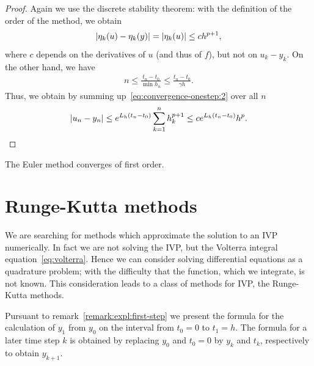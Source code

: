 \begin{proof}
  Again we use the discrete stability theorem: with the definition of
  the order of the method, we obtain
  \begin{gather}
    \label{eq:convergence-onestep:2}
    \lvert\eta_k(u)-\eta_k(y)\rvert = \lvert\eta_k(u)\rvert \le c h^{p+1},
  \end{gather}
  where $c$ depends on the derivatives of $u$ (and thus of $f$), but
  not on $u_k-y_k$. On the other hand, we have
  \begin{gather*}
    n \le \frac{t_n-t_0}{\min h_n} \le \frac{t_n-t_0}{\gamma h}.
  \end{gather*}
  Thus, we obtain by summing up~\eqref{eq:convergence-onestep:2} over all $n$
  \begin{gather*}
    \lvert u_n-y_n\rvert \le e^{L_h(t_n-t_0)}\sum_{k=1}^n h_k^{p+1}
    \le c e^{L_h(t_n-t_0)} h^p.
  \end{gather*}
\end{proof}

\begin{corollary}
  The Euler method converges of first order.
\end{corollary}

\section{Runge-Kutta methods}

\begin{intro}
  We are searching for methods which approximate the solution to an
  IVP numerically.  In fact we are not solving the IVP, but the Volterra
  integral equation~\eqref{eq:volterra}.  Hence we can consider
  solving differential equations as a quadrature problem; with the
  difficulty that the function, which we integrate, is not known. This
  consideration leads to a class of methods for IVP, the
  Runge-Kutta methods.
\end{intro}



\begin{remark}
  Pursuant to remark~\ref{remark:expl:first-step} we present the
  formula for the calculation of $y_1$ from $y_0$ on the interval from
  $t_0=0$ to $t_1 = h$.  The formula for a later time step $k$ is
  obtained by replacing $y_0$ and $t_0=0$ by $y_k$ and $t_k$,
  respectively to obtain $y_{k+1}$.
\end{remark}

